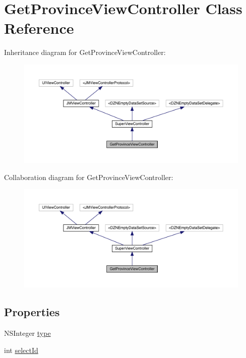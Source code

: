 \hypertarget{interface_get_province_view_controller}{}\section{Get\+Province\+View\+Controller Class Reference}
\label{interface_get_province_view_controller}


Inheritance diagram for Get\+Province\+View\+Controller\+:\nopagebreak
\begin{figure}[H]
\begin{center}
\leavevmode
\includegraphics[width=350pt]{interface_get_province_view_controller__inherit__graph}
\end{center}
\end{figure}


Collaboration diagram for Get\+Province\+View\+Controller\+:\nopagebreak
\begin{figure}[H]
\begin{center}
\leavevmode
\includegraphics[width=350pt]{interface_get_province_view_controller__coll__graph}
\end{center}
\end{figure}
\subsection*{Properties}
\begin{DoxyCompactItemize}
\item 
N\+S\+Integer \mbox{\hyperlink{interface_get_province_view_controller_aee6b3ac67cf0c21d30feadd7ab6f524b}{type}}
\item 
int \mbox{\hyperlink{interface_get_province_view_controller_a44e31c09031b29d63ccee16b3f08b65a}{select\+Id}}
\end{DoxyCompactItemize}
